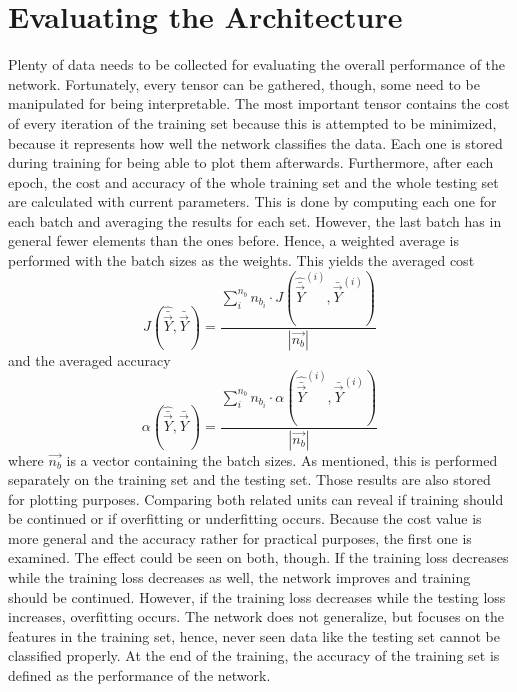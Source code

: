\section{Evaluating the Architecture}
\label{sec:methods-evaluate}
Plenty of data needs to be collected for evaluating the overall performance of the network.
Fortunately, every tensor can be gathered, though, some need to be manipulated for being interpretable.
The most important tensor contains the cost of every iteration of the training set because this is attempted to be minimized, because it represents how well the network classifies the data.
Each one is stored during training for being able to plot them afterwards.
Furthermore, after each epoch, the cost and accuracy of the whole training set and the whole testing set are calculated with current parameters.
This is done by computing each one for each batch and averaging the results for each set.
However, the last batch has in general fewer elements than the ones before.
Hence, a weighted average is performed with the batch sizes as the weights.
This yields the averaged cost
\begin{equation}
	J\left(\hat{\bar{\vec{Y}}}, \bar{\vec{Y}}\right) =  \frac{\sum_{i}^{n_b} n_{b_i} \cdot J\left(\hat{\bar{\vec{Y}}}^{(i)}, \bar{\vec{Y}}^{(i)}\right)}{\left|\vec{n_b}\right|}
\end{equation}
and the averaged accuracy
\begin{equation}
	\alpha\left(\hat{\bar{\vec{Y}}}, \bar{\vec{Y}}\right) =  \frac{\sum_{i}^{n_b} n_{b_i} \cdot \alpha\left(\hat{\bar{\vec{Y}}}^{(i)}, \bar{\vec{Y}}^{(i)}\right)}{\left|\vec{n_b}\right|}
\end{equation}
where $\vec{n_b}$ is a vector containing the batch sizes.
As mentioned, this is performed separately on the training set and the testing set.
Those results are also stored for plotting purposes.
Comparing both related units can reveal if training should be continued or if overfitting or underfitting occurs.
Because the cost value is more general and the accuracy rather for practical purposes, the first one is examined.
The effect could be seen on both, though.
If the training loss decreases while the training loss decreases as well, the network improves and training should be continued.
However, if the training loss decreases while the testing loss increases, overfitting occurs.
The network does not generalize, but focuses on the features in the training set, hence, never seen data like the testing set cannot be classified properly.
At the end of the training, the accuracy of the training set is defined as the performance of the network.
